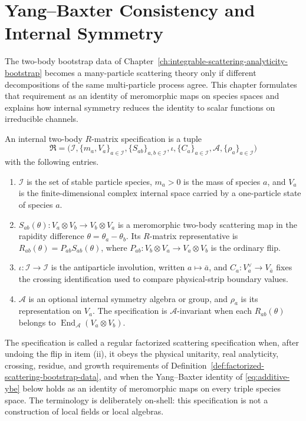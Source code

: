 \chapter{Yang--Baxter Consistency and Internal Symmetry}
\label{ch:integrable-yang-baxter-internal-symmetry}

\ConventionsLorentzian

The two-body bootstrap data of
Chapter~\ref{ch:integrable-scattering-analyticity-bootstrap} becomes a
many-particle scattering theory only if different decompositions of the same
multi-particle process agree.  This chapter formulates that requirement as an
identity of meromorphic maps on species spaces and explains how internal
symmetry reduces the identity to scalar functions on irreducible channels.

\begin{definition}
\label{def:regular-two-body-r-system}
An internal two-body \(R\)-matrix specification is a tuple
\[
  \mathfrak R
  =
  \bigl(
    \mathcal I,\{m_a,V_a\}_{a\in\mathcal I},
    \{S_{ab}\}_{a,b\in\mathcal I},
    \iota,\{C_a\}_{a\in\mathcal I},
    \mathcal A,\{\rho_a\}_{a\in\mathcal I}
  \bigr)
\]
with the following entries.
\begin{enumerate}[label=\textnormal{(\roman*)}]
\item \(\mathcal I\) is the set of stable particle species, \(m_a>0\) is the
  mass of species \(a\), and \(V_a\) is the finite-dimensional complex internal
  space carried by a one-particle state of species \(a\).
\item \(S_{ab}(\theta):V_a\otimes V_b\to V_b\otimes V_a\) is a meromorphic
  two-body scattering map in the rapidity difference
  \(\theta=\theta_a-\theta_b\).  Its \(R\)-matrix representative is
  \(R_{ab}(\theta)=P_{ab}S_{ab}(\theta)\), where
  \(P_{ab}:V_b\otimes V_a\to V_a\otimes V_b\) is the ordinary flip.
\item \(\iota:\mathcal I\to\mathcal I\) is the antiparticle involution,
  written \(a\mapsto\bar a\), and
  \(C_a:V_a^\vee\to V_{\bar a}\) fixes the crossing identification used to
  compare physical-strip boundary values.
\item \(\mathcal A\) is an optional internal symmetry algebra or group, and
  \(\rho_a\) is its representation on \(V_a\).  The specification is
  \(\mathcal A\)-invariant when each \(R_{ab}(\theta)\) belongs to
  \(\operatorname{End}_{\mathcal A}(V_a\otimes V_b)\).
\end{enumerate}
The specification is called a regular factorized scattering specification when, after undoing
the flip in item (ii), it obeys the physical unitarity, real analyticity,
crossing, residue, and growth requirements of
Definition~\ref{def:factorized-scattering-bootstrap-data}, and when the
Yang--Baxter identity of \eqref{eq:additive-ybe} below holds as an identity of
meromorphic maps on every triple species space.  The terminology is deliberately
on-shell: this specification is not a construction of local fields or local algebras.
\end{definition}

